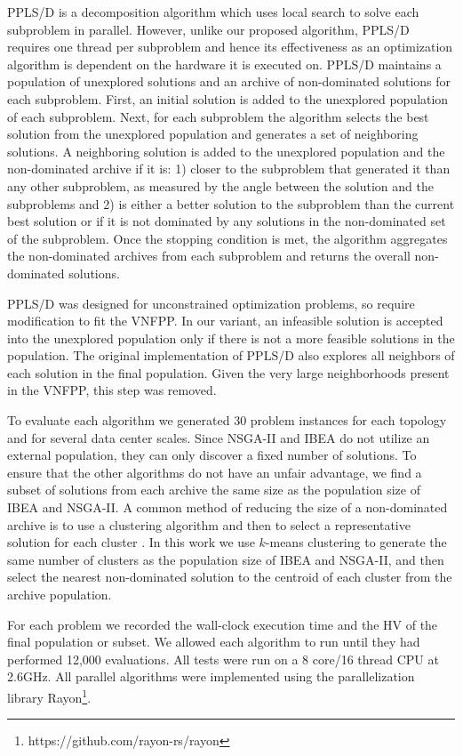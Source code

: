 PPLS/D is a decomposition algorithm which uses local search to solve each subproblem in parallel. However, unlike our proposed algorithm, PPLS/D requires one thread per subproblem and hence its effectiveness as an optimization algorithm is dependent on the hardware it is executed on. PPLS/D maintains a population of unexplored solutions and an archive of non-dominated solutions for each subproblem. First, an initial solution is added to the unexplored population of each subproblem. Next, for each subproblem the algorithm selects the best solution from the unexplored population and generates a set of neighboring solutions. A neighboring solution is added to the unexplored population and the non-dominated archive if it is: 1) closer to the subproblem that generated it than any other subproblem, as measured by the angle between the solution and the subproblems and 2) is either a better solution to the subproblem than the current best solution or if it is not dominated by any solutions in the non-dominated set of the subproblem. Once the stopping condition is met, the algorithm aggregates the non-dominated archives from each subproblem and returns the overall non-dominated solutions.

PPLS/D was designed for unconstrained optimization problems, so require modification to fit the VNFPP. In our variant, an infeasible solution is accepted into the unexplored population only if there is not a more feasible solutions in the population. The original implementation of PPLS/D also explores all neighbors of each solution in the final population. Given the very large neighborhoods present in the VNFPP, this step was removed.

To evaluate each algorithm we generated 30 problem instances for each topology and for several data center scales. Since NSGA-II and IBEA do not utilize an external population, they can only discover a fixed number of solutions. To ensure that the other algorithms do not have an unfair advantage, we find a subset of solutions from each archive the same size as the population size of IBEA and NSGA-II. A common method of reducing the size of a non-dominated archive is to use a clustering algorithm and then to select a representative solution for each cluster \cite{ZioB11}. In this work we use $k$-means clustering \cite{HartiganW79} to generate the same number of clusters as the population size of IBEA and NSGA-II, and then select the nearest non-dominated solution to the centroid of each cluster from the archive population.

For each problem we recorded the wall-clock execution time and the HV of the final population or subset. We allowed each algorithm to run until they had performed 12,000 evaluations. All tests were run on a 8 core/16 thread CPU at 2.6GHz. All parallel algorithms were implemented using the parallelization library Rayon\footnote{https://github.com/rayon-rs/rayon}.

